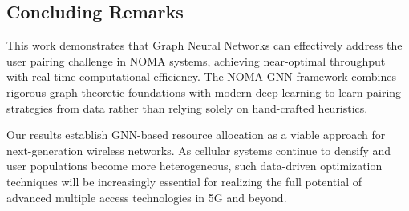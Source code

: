 \subsection{Concluding Remarks}

This work demonstrates that Graph Neural Networks can effectively address the user pairing challenge in NOMA systems, achieving near-optimal throughput with real-time computational efficiency. The NOMA-GNN framework combines rigorous graph-theoretic foundations with modern deep learning to learn pairing strategies from data rather than relying solely on hand-crafted heuristics.

Our results establish GNN-based resource allocation as a viable approach for next-generation wireless networks. As cellular systems continue to densify and user populations become more heterogeneous, such data-driven optimization techniques will be increasingly essential for realizing the full potential of advanced multiple access technologies in 5G and beyond.
